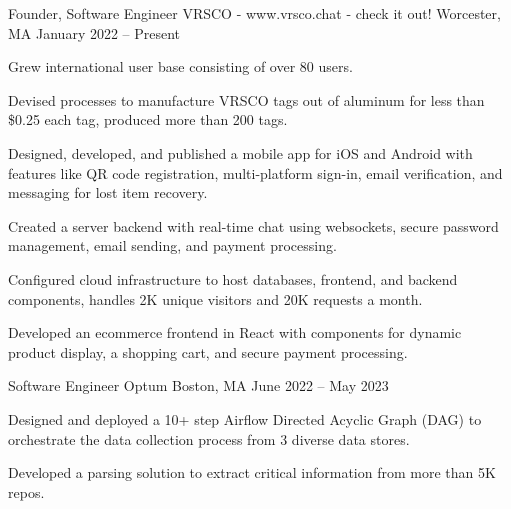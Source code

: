 

\begin{cventries}

  \cventry
    {Founder, Software Engineer} %
    {VRSCO - www.vrsco.chat - check it out!} %
    {Worcester, MA} %
    {January 2022 – Present}
    {
      \begin{cvitems} %
      \item {Grew international user base consisting of over 80 users.}
      \item {Devised processes to manufacture VRSCO tags out of aluminum for less than \$0.25 each tag, produced more than 200 tags.}
      \item {Designed, developed, and published a mobile app for iOS and Android with features like QR code registration, multi-platform sign-in, email verification, and messaging for lost item recovery.}
      \item {Created a server backend with real-time chat using websockets, secure password management, email sending, and payment processing.}
      \item {Configured cloud infrastructure to host databases, frontend, and backend components, handles 2K unique visitors and 20K requests a month.}
      \item {Developed an ecommerce frontend in React with components for dynamic product display, a shopping cart, and secure payment processing.}
      \end{cvitems}
    }
  \cventry
    {Software Engineer} %
    {Optum} %
    {Boston, MA} %
    {June 2022 – May 2023} %
    {
      \begin{cvitems} %
        \item {Designed and deployed a 10+ step Airflow Directed Acyclic Graph (DAG) to orchestrate the data collection process from 3 diverse data stores.}
        \item {Developed a parsing solution to extract critical information from more than 5K repos.}

\end{cvitems}}
\end{cventries}
